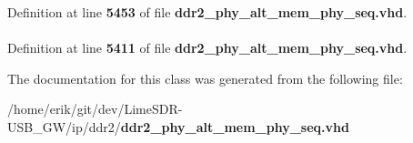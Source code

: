 Definition at line {\bf 5453} of file {\bf ddr2\+\_\+phy\+\_\+alt\+\_\+mem\+\_\+phy\+\_\+seq.\+vhd}.

\paragraph[{work}]{\hspace{0.3cm}{\ttfamily [Library]}}\label{classddr2__phy__alt__mem__phy__admin_1_1struct_a9f49de6f5eed5b4488cba6c9cdd1c215}


Definition at line {\bf 5411} of file {\bf ddr2\+\_\+phy\+\_\+alt\+\_\+mem\+\_\+phy\+\_\+seq.\+vhd}.



The documentation for this class was generated from the following file\+:\begin{DoxyCompactItemize}
\item 
/home/erik/git/dev/\+Lime\+S\+D\+R-\/\+U\+S\+B\+\_\+\+G\+W/ip/ddr2/{\bf ddr2\+\_\+phy\+\_\+alt\+\_\+mem\+\_\+phy\+\_\+seq.\+vhd}\end{DoxyCompactItemize}
